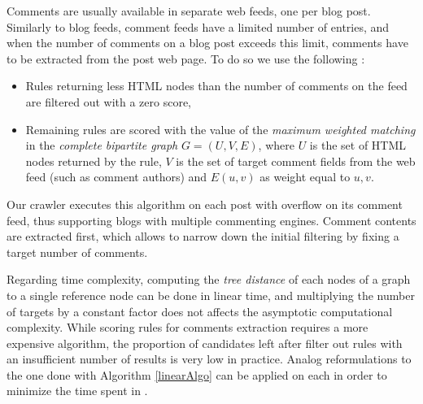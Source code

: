 Comments are usually available in separate web feeds, one per blog post. Similarly to blog feeds, comment feeds have a limited number of entries, and when the number of comments on a blog post exceeds this limit, comments have to be extracted from the post web page. To do so we use the following :
\begin{itemize}
  \item Rules returning less HTML nodes than the number of comments on the feed are filtered out with a zero score,
  \item Remaining rules are scored with the value of the \emph{maximum weighted matching} in the \emph{complete bipartite graph} $G = (U, V, E)$, where $U$ is the set of HTML nodes returned by the rule, $V$ is the set of target comment fields from the web feed (such as comment authors) and $E(u, v)$ as weight equal to \code{\ref{similarityAlgo}(}$u, v$\code{)}.
\end{itemize}
Our crawler executes this algorithm on each post with overflow on its comment feed, thus supporting blogs with multiple commenting engines. Comment contents are extracted first, which allows to narrow down the initial filtering by fixing a target number of comments.

Regarding time complexity, computing the \emph{tree distance} of each nodes of a graph to a single reference node can be done in linear time, and multiplying the number of targets by a constant factor does not affects the asymptotic computational complexity. While scoring rules for comments extraction requires a more expensive algorithm, the proportion of candidates left after filter out rules with an insufficient number of results is very low in practice. Analog reformulations to the one done with Algorithm \ref{linearAlgo} can be applied on each  in order to minimize the time spent in .
